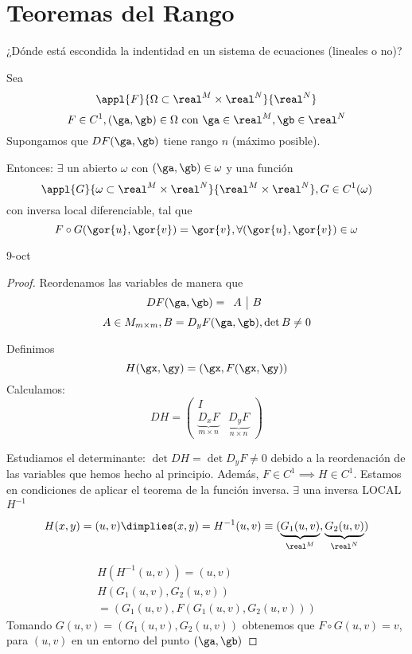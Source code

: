 \section{Teoremas del Rango}

¿Dónde está escondida la indentidad en un sistema de ecuaciones (lineales o no)?

\begin{theorem}
Sea \[\appl{F}{\Omega\subset \real^M\times\real^N}{\real^N}\]
\[F\in C^1, (\ga,\gb) \in \Omega \text{ con } \ga \in \real^M, \gb \in \real^N\]
Supongamos que $DF(\ga,\gb)$ tiene rango $n$ (máximo posible).

Entonces: $\exists$ un abierto $\omega$ con $(\ga,\gb) \in \omega$ y una función \[ \appl{G}{\omega\subset\real^M\times\real^N}{\real^M\times\real^N}, G\in C^1 (\omega)\] con inversa local diferenciable, tal que \[F\circ G(\gor{u},\gor{v}) = \gor{v}, \forall(\gor{u},\gor{v})\in \omega\]

\end{theorem}

9-oct

\begin{proof}
 Reordenamos las variables de manera que \[DF(\ga,\gb) = \begin{array}{c|c} A &B \end{array}\]
 \[A \in M_{m\times m}, B = D_yF(\ga,\gb), \det B \neq 0\]
 
 Definimos \[H(\gx,\gy) = (\gx,F(\gx,\gy))\]
 Calculamos:
 \[DH = \left(\begin{array}{c|c}
         I & \\
         \underbrace{D_xF}_{m\times n} & \underbrace{D_yF}_{n\times n}
        \end{array}\right)\]
        
        
  Estudiamos el determinante: $\det DH = \det D_yF \neq 0$ debido a la reordenación de las variables que hemos hecho al principio. Además, $F\in C^1 \implies H \in C^1$. Estamos en condiciones de aplicar el teorema de la función inversa. $\exists$ una inversa LOCAL $H^{-1}$

  \[H(x,y) = (u,v) \dimplies (x,y) = H^{-1}(u,v) \equiv (\underbrace{G_1(u,v)}_{\real^M},\underbrace{G_2(u,v)}_{\real^N})\]
  
  \begin{gather*}
H(H^{-1}(u,v)) = (u,v)\\
H(G_1(u,v),G_2(u,v))\\
= (G_1(u,v),F(G_1(u,v),G_2(u,v)))
  \end{gather*}
 Tomando $G(u,v) = (G_1(u,v),G_2(u,v))$ obtenemos que $F\circ G(u,v) = v$, para $(u,v)$ en un entorno del punto $(\ga,\gb)$
 
\end{proof}

